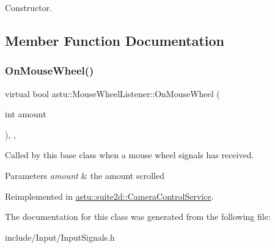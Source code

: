 Constructor. 

\subsection{Member Function Documentation}
\mbox{\label{classastu_1_1MouseWheelListener_ae159bccdfb49aadd58079fb6ce32e914}} 
\subsubsection{\texorpdfstring{On\+Mouse\+Wheel()}{OnMouseWheel()}}
{\footnotesize\ttfamily virtual bool astu\+::\+Mouse\+Wheel\+Listener\+::\+On\+Mouse\+Wheel (\begin{DoxyParamCaption}\item[{int}]{amount }\end{DoxyParamCaption})\hspace{0.3cm}{\ttfamily [inline]}, {\ttfamily [protected]}, {\ttfamily [virtual]}}

Called by this base class when a mouse wheel signals has received.


\begin{DoxyParams}{Parameters}
{\em amount} & the amount scrolled \\
\hline
\end{DoxyParams}


Reimplemented in \hyperlink{classastu_1_1suite2d_1_1CameraControlService_a741757d88bd6f104c71fe8f5f1a7bd69}{astu\+::suite2d\+::\+Camera\+Control\+Service}.



The documentation for this class was generated from the following file\+:\begin{DoxyCompactItemize}
\item 
include/\+Input/Input\+Signals.\+h\end{DoxyCompactItemize}
